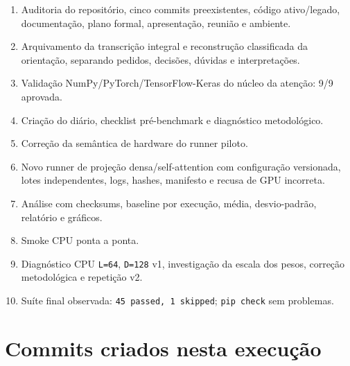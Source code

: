 \begin{enumerate}
\item Auditoria do repositório, cinco commits preexistentes, código ativo/legado,
documentação, plano formal, apresentação, reunião e ambiente.
\item Arquivamento da transcrição integral e reconstrução classificada da
orientação, separando pedidos, decisões, dúvidas e interpretações.
\item Validação NumPy/PyTorch/TensorFlow-Keras do núcleo da atenção: 9/9 aprovada.
\item Criação do diário, checklist pré-benchmark e diagnóstico metodológico.
\item Correção da semântica de hardware do runner piloto.
\item Novo runner de projeção densa/self-attention com configuração versionada,
lotes independentes, logs, hashes, manifesto e recusa de GPU incorreta.
\item Análise com checksums, baseline por execução, média, desvio-padrão, relatório
e gráficos.
\item Smoke CPU ponta a ponta.
\item Diagnóstico CPU \texttt{L=64}, \texttt{D=128} v1, investigação da escala dos pesos,
correção metodológica e repetição v2.
\item Suíte final observada: \texttt{45 passed, 1 skipped}; \texttt{pip check} sem problemas.
\end{enumerate}


\section{Commits criados nesta execução}



